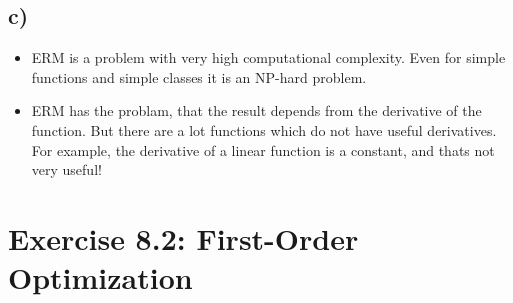 \documentclass[a4paper]{article}
\begin{document}
    
    \subsection*{c)}
        \begin{itemize}
            \item ERM is a problem with very high computational complexity.
            Even for simple functions and simple classes it is an NP-hard problem.
            \item ERM has the problam, that the result depends from the derivative of the function.
            But there are a lot functions which do not have useful derivatives.
            For example, the derivative of a linear function is a constant, and thats not very useful!
        \end{itemize}




\newpage
\section*{Exercise 8.2: First-Order Optimization}
\end{document}

